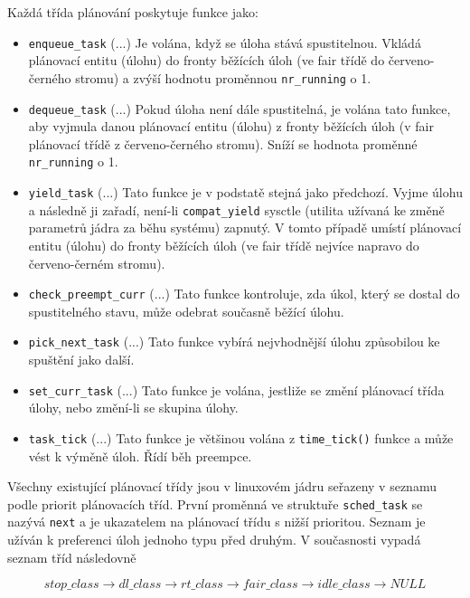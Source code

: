 \documentclass[
  master=true,
  font=sans,
  printversion=false,
  joinlists=true,
  figures=true,
  tables=true,
  sourcecodes=false,
  theorems=false,
  bibencoding=utf8,
  language=czech,
  encoding=utf8,
  field=ainfk,
  biblatex,
  glossaries,
  index
]{kidiplom}
\begin{document}
\noindent
Každá třída plánování poskytuje funkce jako:
\begin{itemize}
\item \verb#enqueue_task# (...) 
Je volána, když se úloha stává spustitelnou. Vkládá plánovací entitu (úlohu) do fronty běžících úloh (ve fair třídě do červeno-černého stromu) a zvýší hodnotu proměnnou \verb#nr_running# o 1.
\item \verb#dequeue_task# (...) 
Pokud úloha není dále spustitelná, je volána tato funkce, aby vyjmula danou plánovací entitu (úlohu) z fronty běžících úloh (v fair plánovací třídě z červeno-černého stromu). Sníží se hodnota proměnné \verb#nr_running# o 1.
\item \verb#yield_task# (...) 
Tato funkce je v podstatě stejná jako předchozí. Vyjme úlohu a následně ji zařadí, není-li \verb#compat_yield# sysctle (utilita užívaná ke změně parametrů jádra za běhu systému) zapnutý. V tomto případě umístí plánovací entitu (úlohu) do fronty běžících úloh (ve fair třídě nejvíce napravo do červeno-černém stromu).
\item \verb#check_preempt_curr# (...) 
Tato funkce kontroluje, zda úkol, který se dostal do spustitelného stavu, může odebrat současně běžící úlohu.
\item \verb#pick_next_task# (...) 
Tato funkce vybírá nejvhodnější úlohu způsobilou ke spuštění jako další.
\item \verb#set_curr_task# (...) 
Tato funkce je volána, jestliže se změní plánovací třída úlohy, nebo změní-li se skupina úlohy.
\item \verb#task_tick# (...) 
Tato funkce je většinou volána z \verb#time_tick()# funkce a může vést k výměně úloh. Řídí běh preempce. \newline
\end{itemize}

Všechny existující plánovací třídy jsou v linuxovém jádru seřazeny v seznamu podle priorit plánovacích tříd. První proměnná ve struktuře \verb#sched_task# se nazývá \verb#next# a je ukazatelem na plánovací třídu s nižší prioritou. Seznam je užíván k preferenci úloh jednoho typu před druhým. V současnosti vypadá seznam tříd následovně

$$ 
stop\_class \rightarrow dl\_class \rightarrow rt\_class \rightarrow fair\_class \rightarrow idle\_class \rightarrow NULL 
$$
\end{document}
